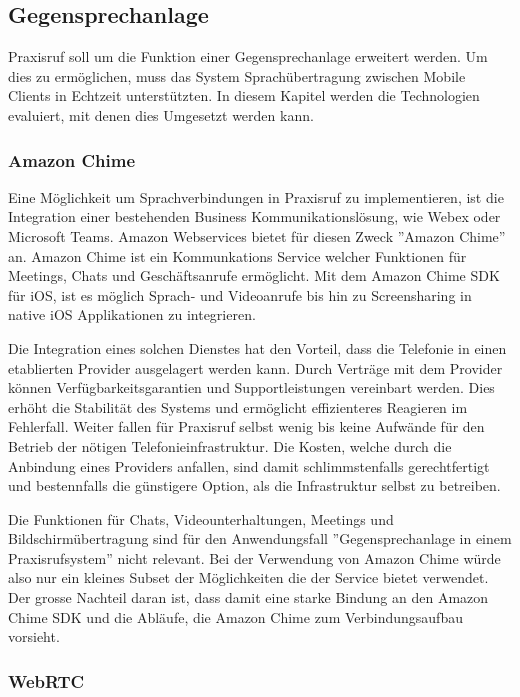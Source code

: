 \subsection{Gegensprechanlage}

Praxisruf soll um die Funktion einer Gegensprechanlage erweitert werden.
Um dies zu ermöglichen, muss das System Sprachübertragung zwischen Mobile Clients in Echtzeit unterstützten.
In diesem Kapitel werden die Technologien evaluiert, mit denen dies Umgesetzt werden kann.

\subsubsection{Amazon Chime}

Eine Möglichkeit um Sprachverbindungen in Praxisruf zu implementieren, ist die Integration einer bestehenden Business Kommunikationslösung, wie Webex oder Microsoft Teams.
Amazon Webservices bietet für diesen Zweck ''Amazon Chime'' an.
Amazon Chime ist ein Kommunkations Service welcher Funktionen für Meetings, Chats und Geschäftsanrufe ermöglicht.\cite{aws_chime}
Mit dem Amazon Chime SDK für iOS, ist es möglich Sprach- und Videoanrufe bis hin zu Screensharing in native iOS Applikationen zu integrieren.\cite{aws_chime_sdk}

Die Integration eines solchen Dienstes hat den Vorteil, dass die Telefonie in einen etablierten Provider ausgelagert werden kann.
Durch Verträge mit dem Provider können Verfügbarkeitsgarantien und Supportleistungen vereinbart werden.
Dies erhöht die Stabilität des Systems und ermöglicht effizienteres Reagieren im Fehlerfall.
Weiter fallen für Praxisruf selbst wenig bis keine Aufwände für den Betrieb der nötigen Telefonieinfrastruktur.
Die Kosten, welche durch die Anbindung eines Providers anfallen, sind damit schlimmstenfalls gerechtfertigt und bestennfalls die günstigere Option, als die Infrastruktur selbst zu betreiben.

Die Funktionen für Chats, Videounterhaltungen, Meetings und Bildschirmübertragung sind für den Anwendungsfall ''Gegensprechanlage in einem Praxisrufsystem'' nicht relevant.
Bei der Verwendung von Amazon Chime würde also nur ein kleines Subset der Möglichkeiten die der Service bietet verwendet.
Der grosse Nachteil daran ist, dass damit eine starke Bindung an den Amazon Chime SDK und die Abläufe, die Amazon Chime zum Verbindungsaufbau vorsieht.

\subsubsection{WebRTC}

